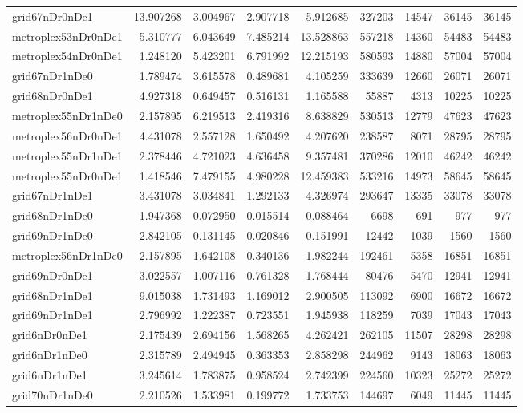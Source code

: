 \begin{longtable}{|l|r|r|r|r|r|r|r|r|}
grid67nDr0nDe1 & 13.907268 & 3.004967 & 2.907718 & 5.912685 & 327203 & 14547 & 36145 & 36145 \\
metroplex53nDr0nDe1 & 5.310777 & 6.043649 & 7.485214 & 13.528863 & 557218 & 14360 & 54483 & 54483 \\
metroplex54nDr0nDe1 & 1.248120 & 5.423201 & 6.791992 & 12.215193 & 580593 & 14880 & 57004 & 57004 \\
grid67nDr1nDe0 & 1.789474 & 3.615578 & 0.489681 & 4.105259 & 333639 & 12660 & 26071 & 26071 \\
grid68nDr0nDe1 & 4.927318 & 0.649457 & 0.516131 & 1.165588 & 55887 & 4313 & 10225 & 10225 \\
metroplex55nDr1nDe0 & 2.157895 & 6.219513 & 2.419316 & 8.638829 & 530513 & 12779 & 47623 & 47623 \\
metroplex56nDr0nDe1 & 4.431078 & 2.557128 & 1.650492 & 4.207620 & 238587 & 8071 & 28795 & 28795 \\
metroplex55nDr1nDe1 & 2.378446 & 4.721023 & 4.636458 & 9.357481 & 370286 & 12010 & 46242 & 46242 \\
metroplex55nDr0nDe1 & 1.418546 & 7.479155 & 4.980228 & 12.459383 & 533216 & 14973 & 58645 & 58645 \\
grid67nDr1nDe1 & 3.431078 & 3.034841 & 1.292133 & 4.326974 & 293647 & 13335 & 33078 & 33078 \\
grid68nDr1nDe0 & 1.947368 & 0.072950 & 0.015514 & 0.088464 & 6698 & 691 & 977 & 977 \\
grid69nDr1nDe0 & 2.842105 & 0.131145 & 0.020846 & 0.151991 & 12442 & 1039 & 1560 & 1560 \\
metroplex56nDr1nDe0 & 2.157895 & 1.642108 & 0.340136 & 1.982244 & 192461 & 5358 & 16851 & 16851 \\
grid69nDr0nDe1 & 3.022557 & 1.007116 & 0.761328 & 1.768444 & 80476 & 5470 & 12941 & 12941 \\
grid68nDr1nDe1 & 9.015038 & 1.731493 & 1.169012 & 2.900505 & 113092 & 6900 & 16672 & 16672 \\
grid69nDr1nDe1 & 2.796992 & 1.222387 & 0.723551 & 1.945938 & 118259 & 7039 & 17043 & 17043 \\
grid6nDr0nDe1 & 2.175439 & 2.694156 & 1.568265 & 4.262421 & 262105 & 11507 & 28298 & 28298 \\
grid6nDr1nDe0 & 2.315789 & 2.494945 & 0.363353 & 2.858298 & 244962 & 9143 & 18063 & 18063 \\
grid6nDr1nDe1 & 3.245614 & 1.783875 & 0.958524 & 2.742399 & 224560 & 10323 & 25272 & 25272 \\
grid70nDr1nDe0 & 2.210526 & 1.533981 & 0.199772 & 1.733753 & 144697 & 6049 & 11445 & 11445 \\

\end{longtable}
